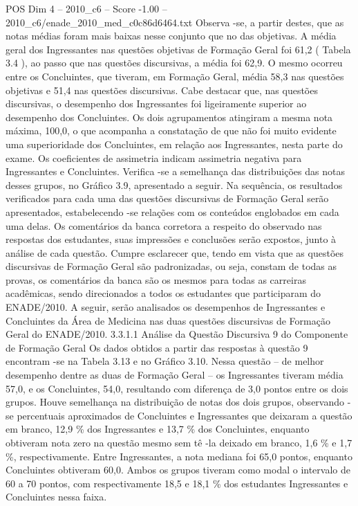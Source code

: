 \begin{textsample}{POS Dim 4 – 2010\_c6 – Score -1.00 – 2010\_c6/enade\_2010\_med\_c0c86d6464.txt}
Observa -se, a partir destes, que as notas médias foram mais baixas nesse conjunto que no das objetivas.
A média geral dos Ingressantes nas questões objetivas de Formação Geral foi 61,2 ( Tabela 3.4 ), ao passo que nas questões discursivas, a média foi 62,9.
O mesmo ocorreu entre os Concluintes, que tiveram, em Formação Geral, média 58,3 nas questões objetivas e 51,4 nas questões discursivas.
Cabe destacar que, nas questões discursivas, o desempenho dos Ingressantes foi ligeiramente superior ao desempenho dos Concluintes.
Os dois agrupamentos atingiram a mesma nota máxima, 100,0, o que acompanha a constatação de que não foi muito evidente uma superioridade dos Concluintes, em relação aos Ingressantes, nesta parte do exame.
Os coeficientes de assimetria indicam assimetria negativa para Ingressantes e Concluintes.
Verifica -se a semelhança das distribuições das notas desses grupos, no Gráfico 3.9, apresentado a seguir.
Na sequência, os resultados verificados para cada uma das questões discursivas de Formação Geral serão apresentados, estabelecendo -se relações com os conteúdos englobados em cada uma delas.
Os comentários da banca corretora a respeito do observado nas respostas dos estudantes, suas impressões e conclusões serão expostos, junto à análise de cada questão.
Cumpre esclarecer que, tendo em vista que as questões discursivas de Formação Geral são padronizadas, ou seja, constam de todas as provas, os comentários da banca são os mesmos para todas as carreiras acadêmicas, sendo direcionados a todos os estudantes que participaram do ENADE/2010.
A seguir, serão analisados os desempenhos de Ingressantes e Concluintes da Área de Medicina nas duas questões discursivas de Formação Geral do ENADE/2010. 3.3.1.1 Análise da Questão Discursiva 9 do Componente de Formação Geral Os dados obtidos a partir das respostas à questão 9 encontram -se na Tabela 3.13 e no Gráfico 3.10.
Nessa questão – de melhor desempenho dentre as duas de Formação Geral – os Ingressantes tiveram média 57,0, e os Concluintes, 54,0, resultando com diferença de 3,0 pontos entre os dois grupos.
Houve semelhança na distribuição de notas dos dois grupos, observando -se percentuais aproximados de Concluintes e Ingressantes que deixaram a questão em branco, 12,9 \% dos Ingressantes e 13,7 \% dos Concluintes, enquanto obtiveram nota zero na questão mesmo sem tê -la deixado em branco, 1,6 \% e 1,7 \%, respectivamente.
Entre Ingressantes, a nota mediana foi 65,0 pontos, enquanto Concluintes obtiveram 60,0.
Ambos os grupos tiveram como modal o intervalo de 60 a 70 pontos, com respectivamente 18,5 e 18,1 \% dos estudantes Ingressantes e Concluintes nessa faixa.

\end{textsample}
